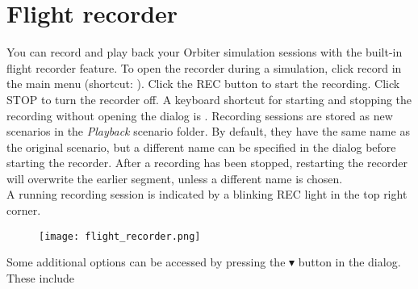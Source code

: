 \documentclass[Orbiter User Manual.tex]{subfiles}
\begin{document}
\section{Flight recorder}
\label{sec:flight_rec}
You can record and play back your Orbiter simulation sessions with the built-in flight recorder feature. To open the recorder during a simulation, click record in the main menu (shortcut: \Ctrl{}). Click the REC button to start the recording. Click STOP to turn the recorder off. A keyboard shortcut for starting and stopping the recording without opening the dialog is \Ctrl{}. Recording sessions are stored as new scenarios in the \textit{Playback} scenario folder. By default, they have the same name as the original scenario, but a different name can be specified in the dialog before starting the recorder. After a recording has been stopped, restarting the recorder will overwrite the earlier segment, unless a different name is chosen.\\
A running recording session is indicated by a blinking REC light in the top right corner.\\

\begin{figure}[H]
	\centering
	\texttt{[image: flight\_recorder.png]}
\end{figure}

\noindent
Some additional options can be accessed by pressing the $\blacktriangledown$ button in the dialog. These include
\end{document}
